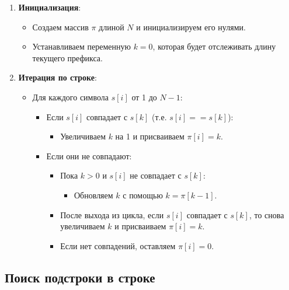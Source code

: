 \documentclass[a4paper]{article}
\begin{document}
\begin{enumerate}
    \item \textbf{Инициализация}:
    \begin{itemize}
        \item Создаем массив $\pi$ длиной $N$ и инициализируем его нулями.
        \item Устанавливаем переменную $k = 0$, которая будет отслеживать длину текущего префикса.
    \end{itemize}

    \item \textbf{Итерация по строке}:
    \begin{itemize}
        \item Для каждого символа $s[i]$ от 1 до $N-1$:
        \begin{itemize}
            \item Если $s[i]$ совпадает с $s[k]$ (т.е. $s[i] == s[k]$):
            \begin{itemize}
                \item Увеличиваем $k$ на 1 и присваиваем $\pi[i] = k$.
            \end{itemize}
            \item Если они не совпадают:
            \begin{itemize}
                \item Пока $k > 0$ и $s[i]$ не совпадает с $s[k]$:
                \begin{itemize}
                    \item Обновляем $k$ с помощью $k = \pi[k-1]$.
                \end{itemize}
                \item После выхода из цикла, если $s[i]$ совпадает с $s[k]$, то снова увеличиваем $k$ и присваиваем $\pi[i] = k$.
                \item Если нет совпадений, оставляем $\pi[i] = 0$.
            \end{itemize}
        \end{itemize}
    \end{itemize}
\end{enumerate}

\subsection{Поиск подстроки в строке}
\end{document}
